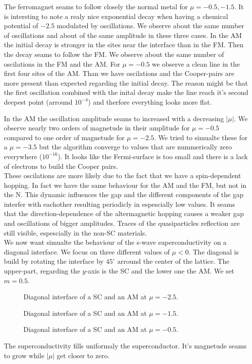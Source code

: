 \documentclass[..\main.tex]{subfile}
\begin{document}
The ferromagnet seams to follow closely the normal metal for $\mu=-0.5,-1.5$. It is intersting to note a realy nice exponential
decay when having a chemical potential of $-2.5$ modulated by oscillations. We observe about the same number of oscillations and about of
the same amplitude in these three cases. In the AM the initial decay is stronger in the sites near the 
interface than in the FM. Then the decay seams to follow the FM. We observe about the same number of oscilations in the FM and the AM.
For $\mu=-0.5$ we observe a clean line in the first four sites of the AM. Than we have oscilations and the Cooper-pairs are more present
than expected regarding the initial decay. The reason might be that the first oscillation combined with the inital decay make the line
reach it's second deepest point (arround $10^{-4}$) and therfore everything looks more flat.

In the AM the oscillation amplitude seams to increased with a decreasing $|\mu|$.
We observe nearly two orders of magnetude in their amplitude for $\mu=-0.5$ compared to one order of magnetude for $\mu=-2.5$.
We tried to simualte these for a $\mu=-3.5$ but the algorithm  converge to values that are nummerically zero everywhere ($10^{-16}$).
It looks like the Fermi-surface is too small and there is a lack of electrons to build the Cooper pairs.\\
 
These oscilations are more likely due to the fact that we have a spin-dependent hopping. In fact we have the same behaviour for the AM
and the FM, but not in the N. This dynamic influences the gap and the different components of the gap interfer with eachother resulting
periodicly in espescially low values. It seams that the direction-dependence of the altermagnetic hopping causes a weaker gap and 
oscillations of bigger amplitudes. Traces of the quasiparticles reflection are still visible, espescially in the non-SC materials.\\

We now want simualte the behaviour of the s-wave superconductivity on a diagonal interface. We focus on three different values of $\mu<0$.  
The diagonal is build by rotating the interface by $45^{\circ}$ arround the center of the lattice. The upper-part, regarding the $y$-axis is the SC
and the lower one the AM. We set $m=0.5$.
\begin{figure}[H]
    \centering
    
    \caption{Diagonal interface of a SC and an AM at $\mu = -2.5$.}
\end{figure}
\begin{figure}[H]
    \centering
    
    \caption{Diagonal interface of a SC and an AM at $\mu = -1.5$.}
\end{figure}
\begin{figure}[H]
    \centering
    
    \caption{Diagonal interface of a SC and an AM at $\mu = -0.5$.}
\end{figure}
The superconductivity fills uniformaly the superconductor. It's magnetude seams to grow while $|\mu|$ get closer to zero.
 
\end{document}
